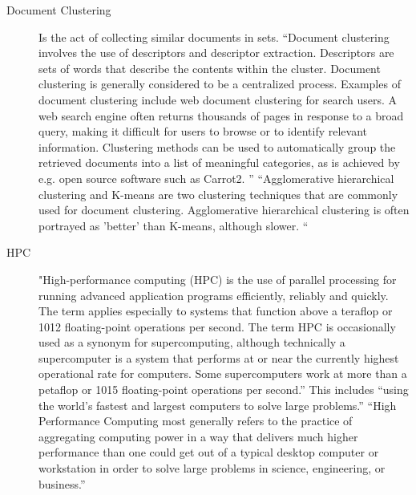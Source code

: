 \documentclass[fleqn,10pt]{SelfArx} %
\begin{document}
\begin{description}
	\item[Document Clustering] Is the act of collecting similar documents in sets. “Document clustering involves the use of descriptors and descriptor extraction. Descriptors are sets of words that describe the contents within the cluster. Document clustering is generally considered to be a centralized process. Examples of document clustering include web document clustering for search users.
	A web search engine often returns thousands of pages in response to a broad query, making it difficult for users to browse or to identify relevant information. Clustering methods can be used to automatically group the retrieved documents into a list of meaningful categories, as is achieved by e.g. open source software such as Carrot2.
	” \cite{document clustering}
	“Agglomerative hierarchical clustering and K-means are two clustering techniques that are commonly used for document clustering. Agglomerative hierarchical clustering is often portrayed as 'better' than K-means, although slower. “ \cite{Doc_clust_techniques}
	
	\item[HPC] 
	"High-performance computing (HPC) is the use of parallel processing for running advanced application programs efficiently, reliably and quickly. The term applies especially to systems that function above a teraflop or 1012 floating-point operations per second. The term HPC is occasionally used as a synonym for supercomputing, although technically a supercomputer is a system that performs at or near the currently highest operational rate for computers. Some supercomputers work at more than a petaflop or 1015 floating-point operations per second.” \cite{hpc_def} This includes “using the world's fastest and largest computers to solve large problems.” \cite{parallel_comp_lawrence_nat_lab}
	“High Performance Computing most generally refers to the practice of aggregating computing power in a way that delivers much higher performance than one could get out of a typical desktop computer or workstation in order to solve large problems in science, engineering, or business.” \cite{hpc}
	

\end{description}
\end{document}
